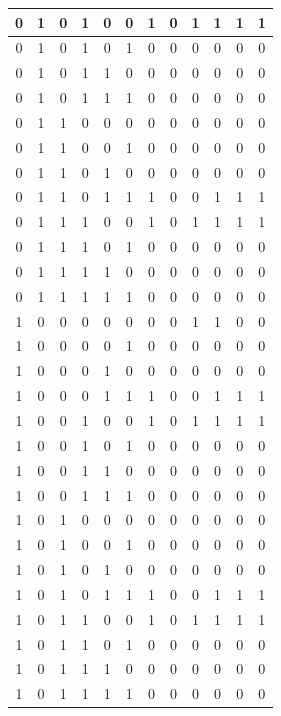 \documentclass[12pt,a4paper]{article}
\begin{document}
\begin{longtable}{|ccc|ccc||ccc|c|c|c|}
0 & 1 & 0 & 1 & 0 & 0 & 1 & 0 & 1 & 1 & 1 & 1 \\ \hline
0 & 1 & 0 & 1 & 0 & 1 & 0 & 0 & 0 & 0 & 0 & 0 \\ \hline
0 & 1 & 0 & 1 & 1 & 0 & 0 & 0 & 0 & 0 & 0 & 0 \\ \hline
0 & 1 & 0 & 1 & 1 & 1 & 0 & 0 & 0 & 0 & 0 & 0 \\ \hline
0 & 1 & 1 & 0 & 0 & 0 & 0 & 0 & 0 & 0 & 0 & 0 \\ \hline
0 & 1 & 1 & 0 & 0 & 1 & 0 & 0 & 0 & 0 & 0 & 0 \\ \hline
0 & 1 & 1 & 0 & 1 & 0 & 0 & 0 & 0 & 0 & 0 & 0 \\ \hline
0 & 1 & 1 & 0 & 1 & 1 & 1 & 0 & 0 & 1 & 1 & 1 \\ \hline
0 & 1 & 1 & 1 & 0 & 0 & 1 & 0 & 1 & 1 & 1 & 1 \\ \hline
0 & 1 & 1 & 1 & 0 & 1 & 0 & 0 & 0 & 0 & 0 & 0 \\ \hline
0 & 1 & 1 & 1 & 1 & 0 & 0 & 0 & 0 & 0 & 0 & 0 \\ \hline
0 & 1 & 1 & 1 & 1 & 1 & 0 & 0 & 0 & 0 & 0 & 0 \\ \hline
1 & 0 & 0 & 0 & 0 & 0 & 0 & 0 & 1 & 1 & 0 & 0 \\ \hline
1 & 0 & 0 & 0 & 0 & 1 & 0 & 0 & 0 & 0 & 0 & 0 \\ \hline
1 & 0 & 0 & 0 & 1 & 0 & 0 & 0 & 0 & 0 & 0 & 0 \\ \hline
1 & 0 & 0 & 0 & 1 & 1 & 1 & 0 & 0 & 1 & 1 & 1 \\ \hline
1 & 0 & 0 & 1 & 0 & 0 & 1 & 0 & 1 & 1 & 1 & 1 \\ \hline
1 & 0 & 0 & 1 & 0 & 1 & 0 & 0 & 0 & 0 & 0 & 0 \\ \hline
1 & 0 & 0 & 1 & 1 & 0 & 0 & 0 & 0 & 0 & 0 & 0 \\ \hline
1 & 0 & 0 & 1 & 1 & 1 & 0 & 0 & 0 & 0 & 0 & 0 \\ \hline
1 & 0 & 1 & 0 & 0 & 0 & 0 & 0 & 0 & 0 & 0 & 0 \\ \hline
1 & 0 & 1 & 0 & 0 & 1 & 0 & 0 & 0 & 0 & 0 & 0 \\ \hline
1 & 0 & 1 & 0 & 1 & 0 & 0 & 0 & 0 & 0 & 0 & 0 \\ \hline
1 & 0 & 1 & 0 & 1 & 1 & 1 & 0 & 0 & 1 & 1 & 1 \\ \hline
1 & 0 & 1 & 1 & 0 & 0 & 1 & 0 & 1 & 1 & 1 & 1 \\ \hline
1 & 0 & 1 & 1 & 0 & 1 & 0 & 0 & 0 & 0 & 0 & 0 \\ \hline
1 & 0 & 1 & 1 & 1 & 0 & 0 & 0 & 0 & 0 & 0 & 0 \\ \hline
1 & 0 & 1 & 1 & 1 & 1 & 0 & 0 & 0 & 0 & 0 & 0 \\ \hline

\end{longtable}
\end{document}
